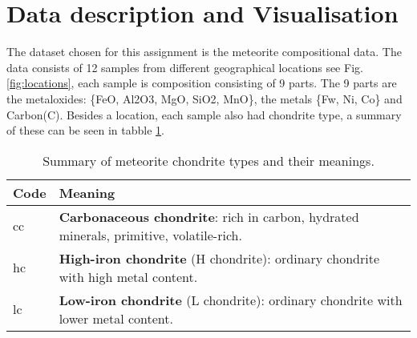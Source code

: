 \section{Data description and Visualisation}

The dataset chosen for this assignment is the meteorite compositional data. The data consists of 12 samples 
from different geographical locations see Fig. \ref{fig:locations}, each sample is composition consisting of 9 parts. The 9 parts are the metaloxides: \{FeO, Al2O3, MgO, SiO2, MnO\}, the metals \{Fw, Ni, Co\} and Carbon(C). Besides a location, each sample also had chondrite type, a summary of these can be seen in tabble \ref{tab:chondrite-types}.

\begin{table}[H]
\centering
\begin{tabular}{@{}ll@{}}
\toprule
\textbf{Code} & \textbf{Meaning} \\ \midrule
cc & \textbf{Carbonaceous chondrite}: rich in carbon, hydrated minerals, primitive, volatile-rich. \\
hc & \textbf{High-iron chondrite} (H chondrite): ordinary chondrite with high metal content. \\
lc & \textbf{Low-iron chondrite} (L chondrite): ordinary chondrite with lower metal content. \\ \bottomrule
\end{tabular}
\caption{Summary of meteorite chondrite types and their meanings.}
\label{tab:chondrite-types}
\end{table}














